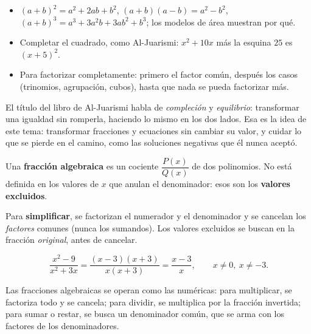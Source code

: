 \documentclass[11pt]{article}
\begin{document}
\begin{resumen}
\begin{itemize}
  \item $(a + b)^2 = a^2 + 2ab + b^2$, $(a + b)(a - b) = a^2 - b^2$,
        $(a + b)^3 = a^3 + 3a^2b + 3ab^2 + b^3$; los modelos de área
        muestran por qué.
  \item Completar el cuadrado, como Al-Juarismi: $x^2 + 10x$ más la esquina
        $25$ es $(x + 5)^2$.
  \item Para factorizar completamente: primero el factor común, después los
        casos (trinomios, agrupación, cubos), hasta que nada se pueda
        factorizar más.
\end{itemize}
\end{resumen}

\label{tema:fraccionesecuaciones}

\begin{hilo}
El título del libro de Al-Juarismi habla de \emph{compleción} y
\emph{equilibrio}: transformar una igualdad sin romperla, haciendo lo mismo
en los dos lados. Esa es la idea de este tema: transformar fracciones y
ecuaciones sin cambiar su valor, y cuidar lo que se pierde en el camino,
como las soluciones negativas que él nunca aceptó.
\end{hilo}

\begin{definicion}
Una \textbf{fracción algebraica} es un cociente $\dfrac{P(x)}{Q(x)}$ de dos
polinomios. No está definida en los valores de $x$ que anulan el
denominador: esos son los \textbf{valores excluidos}.
\end{definicion}

Para \textbf{simplificar}, se factorizan el numerador y el denominador y se
cancelan los \emph{factores} comunes (nunca los sumandos). Los valores
excluidos se buscan en la fracción \emph{original}, antes de cancelar.

\begin{ejemplo}[Simplificar]
\[
  \frac{x^2 - 9}{x^2 + 3x} = \frac{(x - 3)(x + 3)}{x(x + 3)} = \frac{x - 3}{x},
  \qquad x \ne 0,\ x \ne -3.
\]
\end{ejemplo}

Las fracciones algebraicas se operan como las numéricas: para multiplicar,
se factoriza todo y se cancela; para dividir, se multiplica por la fracción
invertida; para sumar o restar, se busca un denominador común, que se arma
con los factores de los denominadores.
\end{document}
